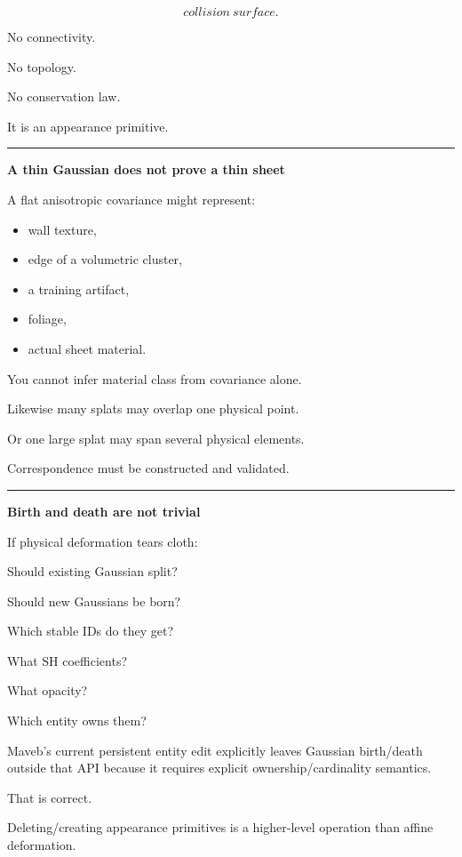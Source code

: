\[
collision\ surface.
\]

No connectivity.

No topology.

No conservation law.

It is an appearance primitive.

\begin{center}\rule{0.5\linewidth}{0.5pt}\end{center}

\textbf{A thin Gaussian does not prove a thin sheet}

A flat anisotropic covariance might represent:

\begin{itemize}
\tightlist
\item
  wall texture,
\item
  edge of a volumetric cluster,
\item
  a training artifact,
\item
  foliage,
\item
  actual sheet material.
\end{itemize}

You cannot infer material class from covariance alone.

Likewise many splats may overlap one physical point.

Or one large splat may span several physical elements.

Correspondence must be constructed and validated.

\begin{center}\rule{0.5\linewidth}{0.5pt}\end{center}

\textbf{Birth and death are not trivial}

If physical deformation tears cloth:

Should existing Gaussian split?

Should new Gaussians be born?

Which stable IDs do they get?

What SH coefficients?

What opacity?

Which entity owns them?

Maveb's current persistent entity edit explicitly leaves Gaussian birth/death outside that API because it requires explicit ownership/cardinality semantics.

That is correct.

Deleting/creating appearance primitives is a higher-level operation than affine deformation.

